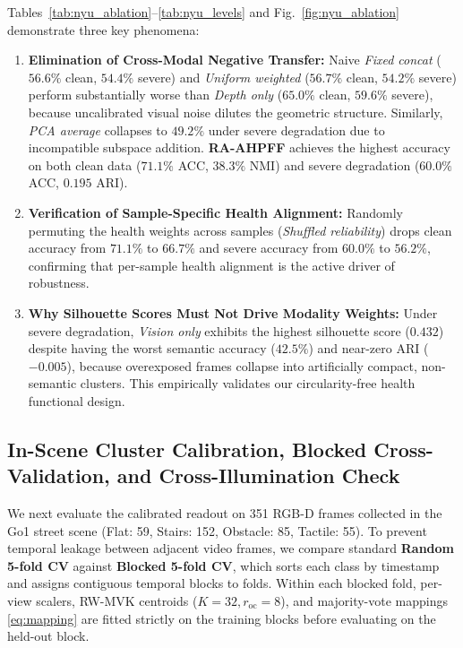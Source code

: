 \documentclass[11pt, a4paper]{article}
\begin{document}
Tables~\ref{tab:nyu_ablation}--\ref{tab:nyu_levels} and Fig.~\ref{fig:nyu_ablation} demonstrate three key phenomena:
\begin{enumerate}
    \item \textbf{Elimination of Cross-Modal Negative Transfer:} Naive \textit{Fixed concat} ($56.6\%$ clean, $54.4\%$ severe) and \textit{Uniform weighted} ($56.7\%$ clean, $54.2\%$ severe) perform substantially worse than \textit{Depth only} ($65.0\%$ clean, $59.6\%$ severe), because uncalibrated visual noise dilutes the geometric structure. Similarly, \textit{PCA average} collapses to $49.2\%$ under severe degradation due to incompatible subspace addition. \textbf{RA-AHPFF} achieves the highest accuracy on both clean data ($71.1\%$ ACC, $38.3\%$ NMI) and severe degradation ($60.0\%$ ACC, $0.195$ ARI).
    \item \textbf{Verification of Sample-Specific Health Alignment:} Randomly permuting the health weights across samples (\textit{Shuffled reliability}) drops clean accuracy from $71.1\%$ to $66.7\%$ and severe accuracy from $60.0\%$ to $56.2\%$, confirming that per-sample health alignment is the active driver of robustness.
    \item \textbf{Why Silhouette Scores Must Not Drive Modality Weights:} Under severe degradation, \textit{Vision only} exhibits the highest silhouette score ($0.432$) despite having the worst semantic accuracy ($42.5\%$) and near-zero ARI ($-0.005$), because overexposed frames collapse into artificially compact, non-semantic clusters. This empirically validates our circularity-free health functional design.
\end{enumerate}

\subsection{In-Scene Cluster Calibration, Blocked Cross-Validation, and Cross-Illumination Check}
\label{subsec:go1_cluster}
We next evaluate the calibrated readout on 351 RGB-D frames collected in the Go1 street scene (Flat: 59, Stairs: 152, Obstacle: 85, Tactile: 55). To prevent temporal leakage between adjacent video frames, we compare standard \textbf{Random 5-fold CV} against \textbf{Blocked 5-fold CV}, which sorts each class by timestamp and assigns contiguous temporal blocks to folds. Within each blocked fold, per-view scalers, RW-MVK centroids ($K=32, r_{\text{oc}}=8$), and majority-vote mappings \eqref{eq:mapping} are fitted strictly on the training blocks before evaluating on the held-out block.
\end{document}
